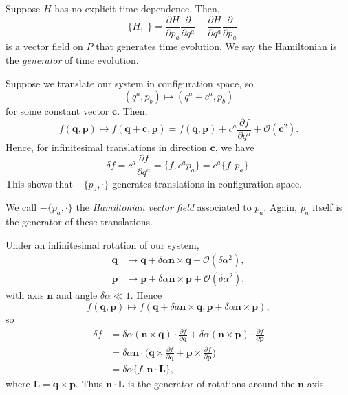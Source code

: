 \documentclass[12pt]{article}
\begin{document}
Suppose $H$ has no explicit time dependence. Then,
\[
	-\{ H, \cdot\} = \frac{\partial H}{\partial p_a} \frac{\partial}{\partial q^a} - \frac{\partial H}{\partial q^a} \frac{\partial}{\partial p_a}
\]
is a vector field on $P$ that generates time evolution. We say the Hamiltonian is the \emph{generator} of time evolution.

Suppose we translate our system in configuration space, so
\[
	(q^a, p_b) \mapsto (q^a + c^a, p_b)
\]
for some constant vector $\mathbf{c}$. Then,
\[
f(\mathbf{q}, \mathbf{p}) \mapsto f(\mathbf{q} + \mathbf{c}, \mathbf{p}) = f(\mathbf{q}, \mathbf{p}) + c^a \frac{\partial f}{\partial q^a} + \mathcal{O}(\mathbf{c}^2).
\]
Hence, for infinitesimal translations in direction $\mathbf{c}$, we have
\[
	\delta f = c^a \frac{\partial f}{\partial q^a} = \{f, c^a p_a\} = c^a \{f, p_a\}.
\]
This shows that $-\{p_a, \cdot\}$ generates translations in configuration space.

We call $-\{p_a, \cdot\}$ the \emph{Hamiltonian vector field} associated to $p_a$. Again, $p_a$ itself is the generator of these translations.

Under an infinitesimal rotation of our system,
\begin{align*}
	\mathbf{q} &\mapsto \mathbf{q} + \delta \alpha \mathbf{n} \times \mathbf{q} + \mathcal{O}(\delta \alpha^2), \\
	\mathbf{p} &\mapsto \mathbf{p} + \delta \alpha \mathbf{n} \times \mathbf{p} + \mathcal{O}(\delta \alpha^2),
\end{align*}
with axis $\mathbf{n}$ and angle $\delta \alpha \ll 1$. Hence
\[
f(\mathbf{q}, \mathbf{p}) \mapsto f(\mathbf{q} + \delta a \mathbf{n} \times \mathbf{q}, \mathbf{p} + \delta \alpha \mathbf{n} \times \mathbf{p}),
\]
so
\begin{align*}
	\delta f &= \delta \alpha (\mathbf{n} \times \mathbf{q}) \cdot \frac{\partial f}{\partial \mathbf{q}} + \delta \alpha (\mathbf{n} \times \mathbf{p}) \cdot \frac{\partial f}{\partial \mathbf{p}} \\
		 &= \delta \alpha \mathbf{n} \cdot \biggl( \mathbf{q} \times \frac{\partial f}{\partial \mathbf{q}} + \mathbf{p} \times \frac{\partial f}{\partial \mathbf{p}} \biggr) \\
		 &= \delta \alpha \{f, \mathbf{n} \cdot \mathbf{L}\},
\end{align*}
where $\mathbf{L} = \mathbf{q} \times \mathbf{p}$. Thus $\mathbf{n} \cdot \mathbf{L}$ is the generator of rotations around the $\mathbf{n}$ axis.
\end{document}
